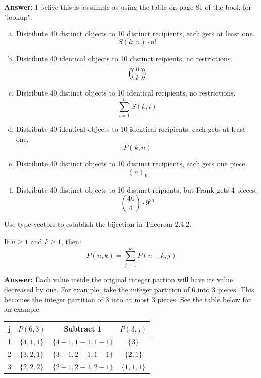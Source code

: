 \documentclass{article}
\begin{document}
\textbf{Answer:}
I belive this is as simple as using the table on page 81 of the book for "lookup".

\begin{enumerate}[(a)]
    \item Distribute 40 distinct objects to 10 distinct recipients, each gets at least one. $$S(k,n) \cdot n!$$
    \item Distribute 40 identical objects to 10 distinct reipients, no restrictions. $$\multiset{n}{k}$$
    \item Distribute 40 distinct objects to 10 identical recipients, no restrictions. $$\sum_{i=1}^{n}S(k,i)$$
    \item Distribute 40 identical objects to 10 identical recipients, each gets at least one. $$P(k,n)$$
    \item Distribute 40 distinct objects to 10 distinct recipients, each gets one piece. $$(n)_k$$
    \item Distribute 40 distinct objects to 10 distinct reipients, but Frank gets 4 pieces.$$\binom{40}{4} \cdot 9^{36}$$
\end{enumerate}


\setcounter{problem}{3}
\begin{problem} %
Use type vectors to establish the bijection in Theorem 2.4.2.
\begin{thm}
    If $n \ge 1$ and $k \ge 1$, then:
    \begin{equation*}
        P(n,k) = \sum_{j=1}^{k} P(n-k,j)
    \end{equation*}
\end{thm}
\end{problem}

\textbf{Answer:}
Each value inside the original integer partion will have its value decreased by one. For example, take the integer partition of 6 into 3 pieces. This becomes the integer partition of 3 into at most 3 pieces. See the table below for an example.

\begin{center}
\begin{tabular}{ |c|c|c|c| } 
\hline
j & $P(6,3)$ & Subtract 1 & $P(3,j)$ \\
\hline
1 & $\{4,1,1\}$ & $\{4-1,1-1,1-1\}$ & $\{3\}$ \\
2 & $\{3,2,1\}$ & $\{3-1,2-1,1-1\}$ & $\{2, 1\}$ \\
3 & $\{2,2,2\}$ & $\{2-1,2-1,2-1\}$ & $\{1, 1, 1\}$ \\  
 \hline
\end{tabular}
\end{center}
\end{document}
